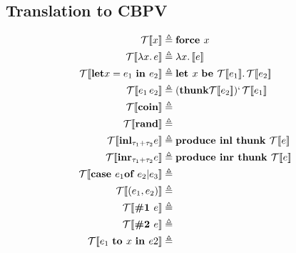 \documentclass{article}
\begin{document}
\subsection{Translation to CBPV}
	\begin{equation*}
		\begin{split}
			\mathcal{T} [\![x]\!] &\triangleq 
			\text{\bf force } x \\
			\mathcal{T} [\![\lambda x.\, e]\!] &\triangleq 
			\lambda x.\, \mathcal[\![ e ]\!] \\
			\mathcal{T} [\![\text{\bf let} x = e_1 \text{ \bf in } e_2]\!] &\triangleq 
			\text{\bf let } x \text{ \bf be } \mathcal{T}[\![e_1]\!].\, \mathcal{T}[\![e_2]\!]\\
			\mathcal{T} [\![e_1\, e_2]\!] &\triangleq 
			(\text{\bf thunk} \mathcal{T}[\![e_2]\!])`\, \mathcal{T}[\![e_1]\!]\\
			\mathcal{T} [\![\text{\bf coin}]\!] &\triangleq \\
			\mathcal{T} [\![\text{\bf rand}]\!] &\triangleq \\
			\mathcal{T} [\![\text{\bf inl}_{\tau_1 + \tau_2} e]\!] &\triangleq
			\text{\bf produce inl thunk } \mathcal{T}[\![e]\!] \\
			\mathcal{T} [\![\text{\bf inr}_{\tau_1 + \tau_2} e]\!] &\triangleq
			\text{\bf produce inr thunk } \mathcal{T}[\![e]\!] \\
			\mathcal{T} [\![\text{\bf case } e_1 \text{\bf of } e_2 | e_3]\!] &\triangleq \\
			\mathcal{T} [\![(e_1, e_2)]\!] &\triangleq \\
			\mathcal{T} [\![\text{\bf \#1 } e]\!] &\triangleq \\
			\mathcal{T} [\![\text{\bf \#2 } e]\!] &\triangleq \\
			\mathcal{T} [\![e_1 \text{ \bf to } x \text{ \bf in } e2]\!] &\triangleq \\
		\end{split}
	\end{equation*}
\end{document}
